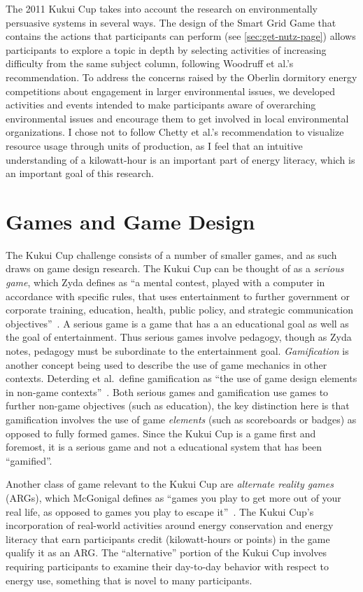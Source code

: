 The 2011 Kukui Cup takes into account the research on environmentally persuasive systems in several ways. The design of the Smart Grid Game that contains the actions that participants can perform (see \autoref{sec:get-nutz-page}) allows participants to explore a topic in depth by selecting activities of increasing difficulty from the same subject column, following Woodruff et al.'s recommendation. To address the concerns raised by the Oberlin dormitory energy competitions about engagement in larger environmental issues, we developed activities and events intended to make participants aware of overarching environmental issues and encourage them to get involved in local environmental organizations. I chose not to follow Chetty et al.'s recommendation to visualize resource usage through units of production, as I feel that an intuitive understanding of a kilowatt-hour is an important part of energy literacy, which is an important goal of this research.


\section{Games and Game Design}

The Kukui Cup challenge consists of a number of smaller games, and as such draws on game design research. The Kukui Cup can be thought of as a \emph{serious game}, which Zyda defines as ``a mental contest, played with a computer in accordance with specific rules, that uses entertainment to further government or corporate training, education, health, public policy, and strategic communication objectives''~\cite{Zyda2005}. A serious game is a game that has a an educational goal as well as the goal of entertainment. Thus serious games involve pedagogy, though as Zyda notes, pedagogy must be subordinate to the entertainment goal. \emph{Gamification} is another concept being used to describe the use of game mechanics in other contexts. Deterding et al.\ define gamification as ``the use of game design elements in non-game contexts''~\cite{Deterding-2011b}. Both serious games and gamification use games to further non-game objectives (such as education), the key distinction here is that gamification involves the use of game \emph{elements} (such as scoreboards or badges) as opposed to fully formed games. Since the Kukui Cup is a game first and foremost, it is a serious game and not a educational system that has been ``gamified''.

Another class of game relevant to the Kukui Cup are \emph{alternate reality games} (ARGs), which McGonigal defines as ``games you play to get more out of your real life, as opposed to games you play to escape it''~\cite[p. 125]{mcgonigal2011reality}. The Kukui Cup's incorporation of real-world activities around energy conservation and energy literacy that earn participants credit (kilowatt-hours or points) in the game qualify it as an ARG. The ``alternative'' portion of the Kukui Cup involves requiring participants to examine their day-to-day behavior with respect to energy use, something that is novel to many participants.

